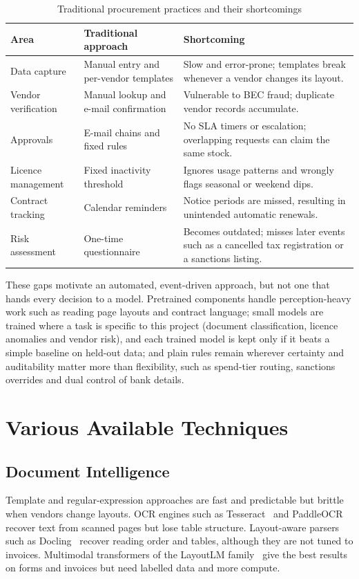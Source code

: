 \begin{table}[H]
\centering\tablestyle
\caption{Traditional procurement practices and their shortcomings}\label{tab:traditional}
\begin{tabularx}{\textwidth}{|L{0.19\textwidth}|L{0.27\textwidth}|Y|}
\hline
\textbf{Area} & \textbf{Traditional approach} & \textbf{Shortcoming} \\ \hline
Data capture & Manual entry and per-vendor templates & Slow and error-prone; templates break whenever a vendor changes its layout. \\ \hline
Vendor verification & Manual lookup and e-mail confirmation & Vulnerable to BEC fraud; duplicate vendor records accumulate. \\ \hline
Approvals & E-mail chains and fixed rules & No SLA timers or escalation; overlapping requests can claim the same stock. \\ \hline
Licence management & Fixed inactivity threshold & Ignores usage patterns and wrongly flags seasonal or weekend dips. \\ \hline
Contract tracking & Calendar reminders & Notice periods are missed, resulting in unintended automatic renewals. \\ \hline
Risk assessment & One-time questionnaire & Becomes outdated; misses later events such as a cancelled tax registration or a sanctions listing. \\ \hline
\end{tabularx}
\end{table}

These gaps motivate an automated, event-driven approach, but not one that hands every decision to a model. Pretrained components handle perception-heavy work such as reading page layouts and contract language; small models are trained where a task is specific to this project (document classification, licence anomalies and vendor risk), and each trained model is kept only if it beats a simple baseline on held-out data; and plain rules remain wherever certainty and auditability matter more than flexibility, such as spend-tier routing, sanctions overrides and dual control of bank details.

\section{Various Available Techniques}

\subsection{Document Intelligence}
Template and regular-expression approaches are fast and predictable but brittle when vendors change layouts. OCR engines such as Tesseract~\cite{smith2007tesseract} and PaddleOCR~\cite{cui2025paddleocr} recover text from scanned pages but lose table structure. Layout-aware parsers such as Docling~\cite{auer2024docling} recover reading order and tables, although they are not tuned to invoices. Multimodal transformers of the LayoutLM family~\cite{xu2020layoutlm,huang2022layoutlmv3} give the best results on forms and invoices but need labelled data and more compute.

